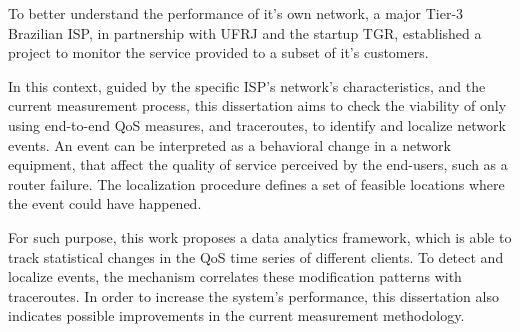 To better understand the performance of it's own network, a major
Tier-3 Brazilian ISP, in partnership with UFRJ and the startup TGR,
established a project to monitor the service provided to a subset
of it's customers.

In this context, guided by the specific ISP's network's characteristics,
and the current measurement process,
this dissertation aims to check the viability of
only using end-to-end QoS measures, and traceroutes,
to identify and localize network events. An event can be interpreted as a
behavioral change in a network equipment, that affect the quality of service
perceived by the end-users,
such as a router failure. The localization procedure defines a set of
feasible locations where the event could have happened.

For such purpose, this work proposes a data analytics framework, which is able
to track statistical changes in the QoS time series of different
clients.
To detect and localize events, the mechanism correlates these modification
patterns with traceroutes.
In order to increase the system's performance,
this dissertation also indicates possible improvements in the current
measurement methodology.
